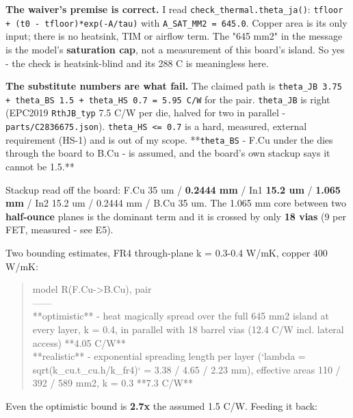 \documentclass[11pt,a4paper]{article}
\begin{document}
\textbf{The waiver's premise is correct.} I read \texttt{check\_thermal.theta\_ja()}: \texttt{tfloor + (t0 - tfloor){*}exp(-A/tau)} with \texttt{A\_SAT\_MM2 = 645.0}. Copper area is its only input; there is no heatsink, TIM or airflow term. The "645 mm2" in the message is the model's \textbf{saturation cap}, not a measurement of this board's island. So yes - the check is heatsink-blind and its 288 C is meaningless here.

\textbf{The substitute numbers are what fail.} The claimed path is \texttt{theta\_JB 3.75 + theta\_BS 1.5 + theta\_HS 0.7 = 5.95 C/W} for the pair. \texttt{theta\_JB} is right (EPC2019 \texttt{RthJB\_typ} 7.5 C/W per die, halved for two in parallel - \texttt{parts/C2836675.json}). \texttt{theta\_HS \textless{}= 0.7} is a hard, measured, external requirement (HS-1) and is out of my scope. {*}{*}\texttt{theta\_BS} - F.Cu under the dies through the board to B.Cu - is assumed, and the board's own stackup says it cannot be 1.5.{*}{*}

Stackup read off the board: F.Cu 35 um / \textbf{0.2444 mm} / In1 \textbf{15.2 um} / \textbf{1.065 mm} / In2 15.2 um / 0.2444 mm / B.Cu 35 um. The 1.065 mm core between two \textbf{half-ounce} planes is the dominant term and it is crossed by only \textbf{18 vias} (9 per FET, measured - see E5).

Two bounding estimates, FR4 through-plane k = 0.3-0.4 W/mK, copper 400 W/mK:

\begin{quote}\small\ttfamily\raggedright
\textbar{} model \textbar{} R(F.Cu-\textgreater{}B.Cu), pair \textbar{}\\
\textbar{}---\textbar{}---\textbar{}\\
\textbar{} {*}{*}optimistic{*}{*} - heat magically spread over the full 645 mm2 island at every layer, k = 0.4, in parallel with 18 barrel vias (12.4 C/W incl. lateral access) \textbar{} {*}{*}4.05 C/W{*}{*} \textbar{}\\
\textbar{} {*}{*}realistic{*}{*} - exponential spreading length per layer (`lambda = sqrt(k\_cu.t\_cu.h/k\_fr4)` = 3.38 / 4.65 / 2.23 mm), effective areas 110 / 392 / 589 mm2, k = 0.3 \textbar{} {*}{*}7.3 C/W{*}{*} \textbar{}
\end{quote}
Even the optimistic bound is \textbf{2.7x} the assumed 1.5 C/W. Feeding it back:
\end{document}
